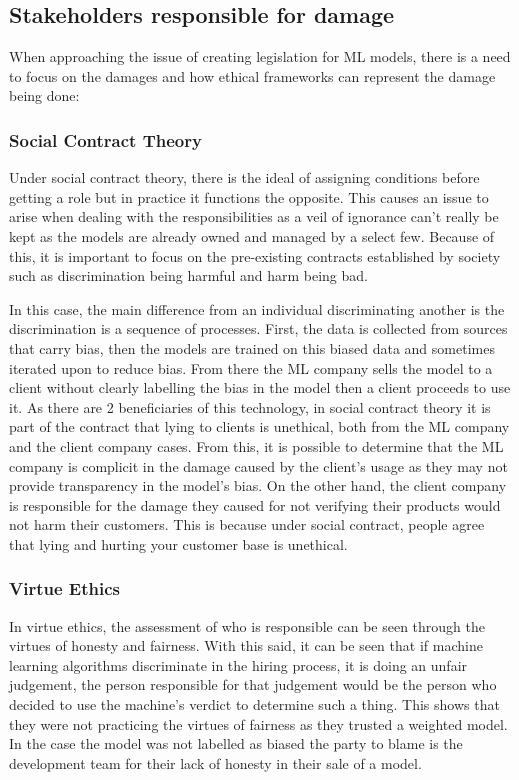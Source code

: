 \subsection{Stakeholders responsible for damage}
When approaching the issue of creating legislation for ML models, there is a need to focus on the damages and how ethical frameworks can represent the damage being done:

\subsubsection{Social Contract Theory}
Under social contract theory, there is the ideal of assigning conditions before getting a role but in practice it functions the opposite. This causes an issue to arise when dealing with the responsibilities as a veil of ignorance can't really be kept as the models are already owned and managed by a select few. Because of this, it is important to focus on the pre-existing contracts established by society such as discrimination being harmful and harm being bad.

In this case, the main difference from an individual discriminating another is the discrimination is a sequence of processes. First, the data is collected from sources that carry bias, then the models are trained on this biased data and sometimes iterated upon to reduce bias. From there the ML company sells the model to a client without clearly labelling the bias in the model then a client proceeds to use it. As there are 2 beneficiaries of this technology, in social contract theory it is part of the contract that lying to clients is unethical, both from the ML company and the client company cases. From this, it is possible to determine that the ML company is complicit in the damage caused by the client's usage as they may not provide transparency in the model's bias. On the other hand, the client company is responsible for the damage they caused for not verifying their products would not harm their customers. This is because under social contract, people agree that lying and hurting your customer base is unethical.

\subsubsection{Virtue Ethics}
In virtue ethics, the assessment of who is responsible can be seen through the virtues of honesty and fairness. With this said, it can be seen that if machine learning algorithms discriminate in the hiring process, it is doing an unfair judgement, the person responsible for that judgement would be the person who decided to use the machine's verdict to determine such a thing. This shows that they were not practicing the virtues of fairness as they trusted a weighted model. In the case the model was not labelled as biased the party to blame is the development team for their lack of honesty in their sale of a model.

